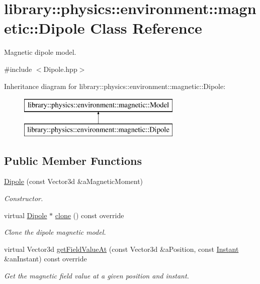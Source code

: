 \hypertarget{classlibrary_1_1physics_1_1environment_1_1magnetic_1_1_dipole}{}\section{library\+:\+:physics\+:\+:environment\+:\+:magnetic\+:\+:Dipole Class Reference}
\label{classlibrary_1_1physics_1_1environment_1_1magnetic_1_1_dipole}


Magnetic dipole model.  




{\ttfamily \#include $<$Dipole.\+hpp$>$}

Inheritance diagram for library\+:\+:physics\+:\+:environment\+:\+:magnetic\+:\+:Dipole\+:\begin{figure}[H]
\begin{center}
\leavevmode
\includegraphics[height=2.000000cm]{classlibrary_1_1physics_1_1environment_1_1magnetic_1_1_dipole}
\end{center}
\end{figure}
\subsection*{Public Member Functions}
\begin{DoxyCompactItemize}
\item 
\hyperlink{classlibrary_1_1physics_1_1environment_1_1magnetic_1_1_dipole_aaf456bb3bbfd0db11f481dada42ef693}{Dipole} (const Vector3d \&a\+Magnetic\+Moment)
\begin{DoxyCompactList}\small\item\em Constructor. \end{DoxyCompactList}\item 
virtual \hyperlink{classlibrary_1_1physics_1_1environment_1_1magnetic_1_1_dipole}{Dipole} $\ast$ \hyperlink{classlibrary_1_1physics_1_1environment_1_1magnetic_1_1_dipole_abeeb539f682bfd435309c380cf524af2}{clone} () const override
\begin{DoxyCompactList}\small\item\em Clone the dipole magnetic model. \end{DoxyCompactList}\item 
virtual Vector3d \hyperlink{classlibrary_1_1physics_1_1environment_1_1magnetic_1_1_dipole_a7d58a3d6e2f5255f67c727a42f3a7a63}{get\+Field\+Value\+At} (const Vector3d \&a\+Position, const \hyperlink{classlibrary_1_1physics_1_1time_1_1_instant}{Instant} \&an\+Instant) const override
\begin{DoxyCompactList}\small\item\em Get the magnetic field value at a given position and instant. \end{DoxyCompactList}\end{DoxyCompactItemize}


